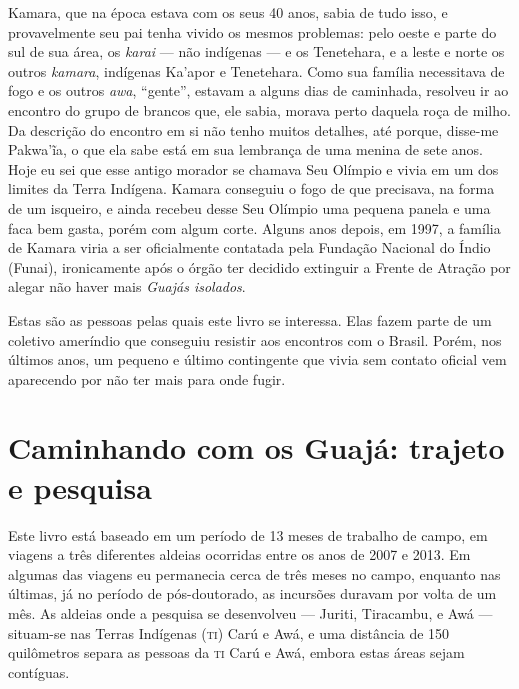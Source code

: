 Kamara, que na época estava com os seus 40 anos, sabia de tudo isso, e
provavelmente seu pai tenha vivido os mesmos problemas: pelo oeste e
parte do sul de sua área, os \textit{karai} --- não indígenas --- e os Tenetehara, e a leste e norte os outros \textit{kamara}, indígenas
Ka'apor e Tenetehara. Como sua família necessitava de fogo e os outros
\textit{awa}, ``gente'', estavam a alguns dias de caminhada, resolveu ir ao
encontro do grupo de brancos que, ele sabia, morava perto daquela
roça de milho. Da descrição do encontro em si não tenho muitos detalhes,
até porque, disse-me Pakwa'ĩa, o que ela sabe está em sua lembrança de
uma menina de sete anos. Hoje eu sei que esse antigo morador se chamava
Seu Olímpio e vivia em um dos limites da Terra Indígena. Kamara
conseguiu o fogo de que precisava, na forma de um isqueiro, e ainda
recebeu desse Seu Olímpio uma pequena panela e uma faca bem gasta, porém
com algum corte. Alguns anos depois, em 1997, a família de Kamara viria
a ser oficialmente contatada pela Fundação Nacional do Índio (Funai),
ironicamente após o órgão ter decidido extinguir a Frente de Atração por
alegar não haver mais \textit{Guajás isolados}.

Estas são as pessoas pelas quais este livro se interessa. Elas fazem
parte de um coletivo ameríndio que conseguiu resistir aos encontros com
o Brasil. Porém, nos últimos anos, um pequeno e último
contingente que vivia sem contato oficial vem aparecendo por não ter
mais para onde fugir.

\section{Caminhando com os Guajá: trajeto e pesquisa}

Este livro está baseado em um período de 13 meses de trabalho de campo,
em viagens a três diferentes aldeias ocorridas entre os anos de 2007 e
2013. Em algumas das viagens eu permanecia cerca de três meses no campo,
enquanto nas últimas, já no período de pós-doutorado, as incursões
duravam por volta de um mês. As aldeias onde a pesquisa se desenvolveu --- Juriti, Tiracambu, e Awá --- situam-se nas Terras Indígenas (\textsc{ti}) Carú e Awá, e uma
distância de 150 quilômetros separa as pessoas da \textsc{ti} Carú e Awá, embora estas áreas
sejam contíguas. 


